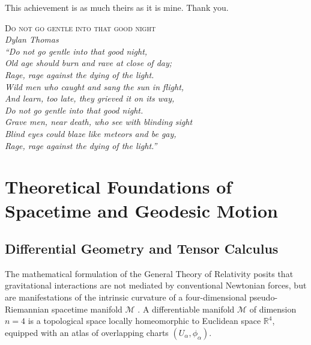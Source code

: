 \documentclass[11pt]{book}
\begin{document}
This achievement is as much theirs as it is mine. Thank you.
\newpage
\thispagestyle{empty} 
\vspace*{\fill} 
\begin{flushright}

	\large\textsc{Do not go gentle into that good night}\\[0.3em]
	\normalsize\textit{Dylan Thomas}\\[2em]
	
	\large
	\textit{``Do not go gentle into that good night,\\
		Old age should burn and rave at close of day;\\
		Rage, rage against the dying of the light.\\[1.5em]
		Wild men who caught and sang the sun in flight,\\
		And learn, too late, they grieved it on its way,\\
		Do not go gentle into that good night.\\[1.5em]
		Grave men, near death, who see with blinding sight\\
		Blind eyes could blaze like meteors and be gay,\\
		Rage, rage against the dying of the light.''}
\end{flushright}
\vspace{2cm} %


\newpage
\tableofcontents
\newpage

\chapter{Theoretical Foundations of Spacetime and Geodesic Motion}

\section{Differential Geometry and Tensor Calculus}

The mathematical formulation of the General Theory of Relativity posits that gravitational interactions are not mediated by conventional Newtonian forces, but are manifestations of the intrinsic curvature of a four-dimensional pseudo-Riemannian spacetime manifold $\mathcal{M}$ \cite{Misner1973, Wald1984}. A differentiable manifold $\mathcal{M}$ of dimension $n=4$ is a topological space locally homeomorphic to Euclidean space $\mathbb{R}^4$, equipped with an atlas of overlapping charts $(U_\alpha, \phi_\alpha)$.
\end{document}
